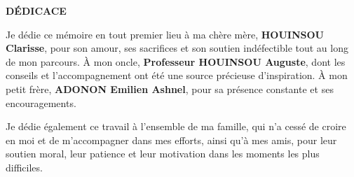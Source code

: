 \thispagestyle{empty}

\vspace*{4cm}

\begin{center}
\Large \textbf{DÉDICACE}
\end{center}

\vspace{1cm}

Je dédie ce mémoire en tout premier lieu à ma chère mère, \textbf{HOUINSOU Clarisse}, pour son amour, ses sacrifices et son soutien indéfectible tout au long de mon parcours. À mon oncle, \textbf{Professeur HOUINSOU Auguste}, dont les conseils et l'accompagnement ont été une source précieuse d'inspiration. À mon petit frère, \textbf{ADONON Emilien Ashnel}, pour sa présence constante et ses encouragements.

\medskip

Je dédie également ce travail à l'ensemble de ma famille, qui n'a cessé de croire en moi et de m'accompagner dans mes efforts, ainsi qu'à mes amis, pour leur soutien moral, leur patience et leur motivation dans les moments les plus difficiles.

\vfill
